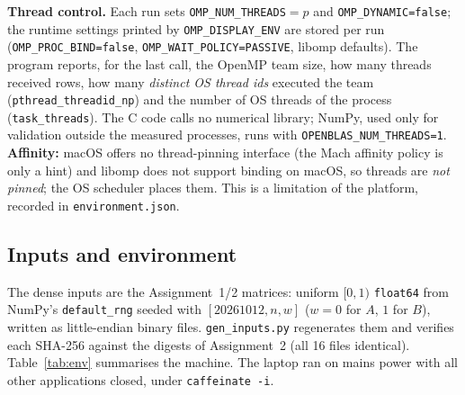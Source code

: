\textbf{Thread control.} Each run sets \texttt{OMP\_NUM\_THREADS}$=p$ and \texttt{OMP\_DYNAMIC=false}; the runtime settings printed by
\texttt{OMP\_DISPLAY\_ENV} are stored per run (\texttt{OMP\_PROC\_BIND=false}, \texttt{OMP\_WAIT\_POLICY=PASSIVE}, libomp defaults). The
program reports, for the last call, the OpenMP team size, how many threads received rows, how many \emph{distinct OS thread ids} executed
the team (\texttt{pthread\_threadid\_np}) and the number of OS threads of the process (\texttt{task\_threads}). The C code calls no numerical
library; NumPy, used only for validation outside the measured processes, runs with \texttt{OPENBLAS\_NUM\_THREADS=1}.
\textbf{Affinity:} macOS offers no thread-pinning interface (the Mach affinity policy is only a hint) and libomp does not support binding on
macOS, so threads are \emph{not pinned}; the OS scheduler places them. This is a limitation of the platform, recorded in \texttt{environment.json}.

\subsection{Inputs and environment}
The dense inputs are the Assignment~1/2 matrices: uniform $[0,1)$ \texttt{float64} from NumPy's \texttt{default\_rng} seeded with
$[20261012, n, w]$ ($w=0$ for $A$, $1$ for $B$), written as little-endian binary files. \texttt{gen\_inputs.py} regenerates them and verifies each SHA-256
against the digests of Assignment~2 (all 16 files identical). Table~\ref{tab:env} summarises the machine. The laptop ran on mains power with
all other applications closed, under \texttt{caffeinate -i}.

\begin{table}[!htb]\centering\small
\caption{Environment (from \texttt{results/environment.json}, recorded with \texttt{sysctl}, \texttt{sw\_vers}, \texttt{clang --version}).}
\label{tab:env}
\end{table}

